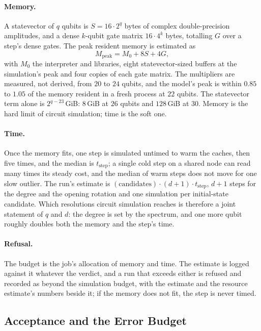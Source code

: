 \paragraph{Memory.} A statevector of $q$ qubits is $S=16\cdot2^q$ bytes of complex double-precision amplitudes, and a dense $k$-qubit gate matrix $16\cdot4^k$ bytes, totalling $G$ over a step's dense gates. The peak resident memory is estimated as
\begin{equation*}
    M_{\mathrm{peak}}=M_0+8S+4G,
\end{equation*}
with $M_0$ the interpreter and libraries, eight statevector-sized buffers at the simulation's peak and four copies of each gate matrix. The multipliers are measured, not derived, from $20$ to $24$ qubits, and the model's peak is within $0.85$ to $1.05$ of the memory resident in a fresh process at $22$ qubits. The statevector term alone is $2^{q-23}$\,GiB: $8$\,GiB at $26$ qubits and $128$\,GiB at $30$. Memory is the hard limit of circuit simulation; time is the soft one.

\paragraph{Time.} Once the memory fits, one step is simulated untimed to warm the caches, then five times, and the median is $t_{\mathrm{step}}$; a single cold step on a shared node can read many times its steady cost, and the median of warm steps does not move for one slow outlier. The run's estimate is $(\text{candidates})\cdot(d+1)\cdot t_{\mathrm{step}}$, $d+1$ steps for the degree and the opening rotation and one simulation per initial-state candidate. Which resolutions circuit simulation reaches is therefore a joint statement of $q$ and $d$: the degree is set by the spectrum, and one more qubit roughly doubles both the memory and the step's time.

\paragraph{Refusal.} The budget is the job's allocation of memory and time. The estimate is logged against it whatever the verdict, and a run that exceeds either is refused and recorded as beyond the simulation budget, with the estimate and the resource estimate's numbers beside it; if the memory does not fit, the step is never timed.

\subsection{Acceptance and the Error Budget}
\label{app:error-budget}

